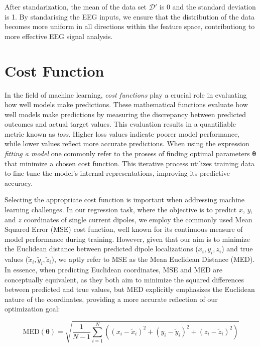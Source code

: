 \documentclass[a4paper, UKenglish, 11pt]{uiomaster}
\begin{document}
After standarization, the mean of the data set $\mathcal{D}'$  is 0 and the standard deviation is 1. By standarising the EEG inputs, we ensure that the distribution of the data becomes more uniform in all directions within the feature space, contributiong to more effective EEG signal analysis.


\section{Cost Function}
In the field of machine learning, \emph{cost functions} play a crucial role in evaluating how well models make predictions. These mathematical functions evaluate how well models make predictions by measuring the discrepancy between predicted outcomes and actual target values. This evaluation results in a quantifiable metric known as \emph{loss}. Higher loss values indicate poorer model performance, while lower values reflect more accurate predictions. When using the expression \emph{fitting a model} one commonly refer to the prosess of finding optimal parameters $\boldsymbol{\theta}$ that minimize a chosen cost function. This iterative process utilizes training data to fine-tune the model's internal representations, improving its predictive accuracy.

Selecting the appropriate cost function is important when addressing machine learning challenges. In our regression task, where the objective is to predict $x$, $y$, and $z$ coordinates of single current dipoles, we employ the commonly used Mean Squared Error (MSE) cost function, well known for its continuous measure of model performance during training. However, given that our aim is to minimize the Euclidean distance between predicted dipole localizations (${x_i, y_i, z_i}$) and true values ($\tilde{x}_i, \tilde{y}_i, \tilde{z}_i$), we aptly refer to MSE as the Mean Euclidean Distance (MED). In essence, when predicting Euclidean coordinates, MSE and MED are conceptually equivalent, as they both aim to minimize the squared differences between predicted and true values, but MED explicitly emphasizes the Euclidean nature of the coordinates, providing a more accurate reflection of our optimization goal:

\begin{equation}
\text{MED}(\boldsymbol{\theta}) = \sqrt{\frac{1}{N-1} \sum_{i=1}^{N} \left((x_i - \tilde{x}_i)^2 + (y_i - \tilde{y}_i)^2 + (z_i - \tilde{z}_i)^2\right)}
\label{eq:MED}
\end{equation}
%
\end{document}
